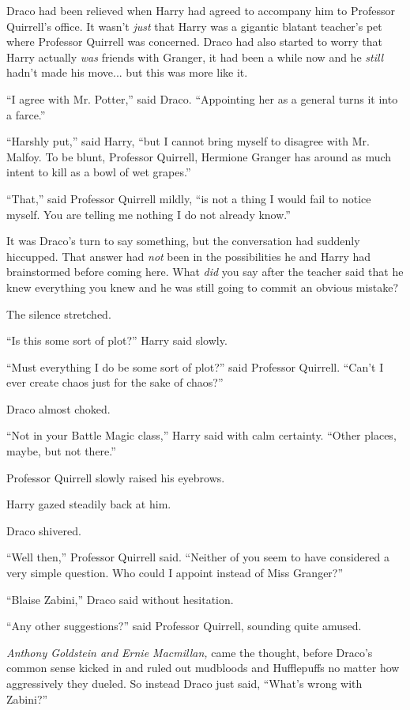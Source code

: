 Draco had been relieved when Harry had agreed to accompany him to
Professor Quirrell's office. It wasn't \emph{just} that Harry was a
gigantic blatant teacher's pet where Professor Quirrell was concerned.
Draco had also started to worry that Harry actually \emph{was} friends
with Granger, it had been a while now and he \emph{still} hadn't made
his move... but this was more like it.

``I agree with Mr. Potter,'' said Draco. ``Appointing her as a general
turns it into a farce.''

``Harshly put,'' said Harry, ``but I cannot bring myself to disagree
with Mr. Malfoy. To be blunt, Professor Quirrell, Hermione Granger has
around as much intent to kill as a bowl of wet grapes.''

``That,'' said Professor Quirrell mildly, ``is not a thing I would fail
to notice myself. You are telling me nothing I do not already know.''

It was Draco's turn to say something, but the conversation had suddenly
hiccupped. That answer had \emph{not} been in the possibilities he and
Harry had brainstormed before coming here. What \emph{did} you say after
the teacher said that he knew everything you knew and he was still going
to commit an obvious mistake?

The silence stretched.

``Is this some sort of plot?'' Harry said slowly.

``Must everything I do be some sort of plot?'' said Professor Quirrell.
``Can't I ever create chaos just for the sake of chaos?''

Draco almost choked.

``Not in your Battle Magic class,'' Harry said with calm certainty.
``Other places, maybe, but not there.''

Professor Quirrell slowly raised his eyebrows.

Harry gazed steadily back at him.

Draco shivered.

``Well then,'' Professor Quirrell said. ``Neither of you seem to have
considered a very simple question. Who could I appoint instead of Miss
Granger?''

``Blaise Zabini,'' Draco said without hesitation.

``Any other suggestions?'' said Professor Quirrell, sounding quite
amused.

\emph{Anthony Goldstein and Ernie Macmillan,} came the thought, before
Draco's common sense kicked in and ruled out mudbloods and Hufflepuffs
no matter how aggressively they dueled. So instead Draco just said,
``What's wrong with Zabini?''

